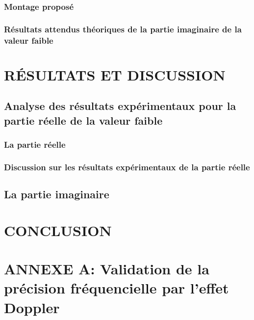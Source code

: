 \documentclass[superscriptaddress,12pt]{article}
\begin{document}
    \subsubsection{Montage proposé}
    
    \subsubsection{Résultats attendus théoriques de la partie imaginaire de la valeur faible}
    
    
    \pagebreak

    \thispagestyle{empty}
    \section{RÉSULTATS ET DISCUSSION}    
    
    \subsection{Analyse des résultats expérimentaux pour la partie réelle de la valeur faible}
    
    \subsubsection{La partie réelle}
    
    \subsubsection{Discussion sur les résultats expérimentaux de la partie réelle}
    
    \subsection{La partie imaginaire}
    

    \pagebreak

    \thispagestyle{empty}
    \section{CONCLUSION}
    
    \pagebreak

    \printbibliography	

    \pagebreak

    \thispagestyle{empty}

    \pagebreak

    \appendix
    \section*{ANNEXE A: Validation de la précision fréquencielle par l'effet Doppler}
    

    \pagebreak
    \thispagestyle{empty}
\end{document}
